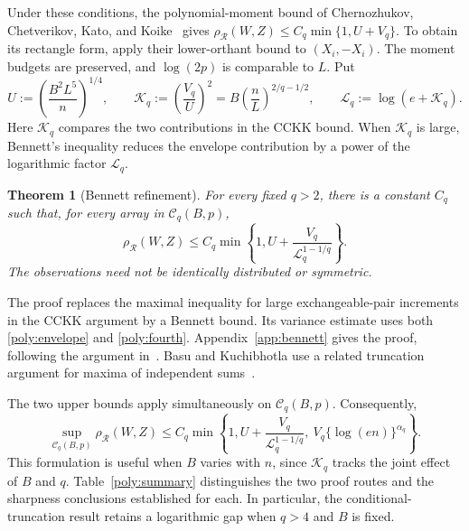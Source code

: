 \documentclass[11pt,letterpaper]{article}
\newtheorem{theorem}{Theorem}
\theoremstyle{remark}
\newcommand{\rh}{\rho_{\mathcal R}}
\begin{document}
Under these conditions, the polynomial-moment bound of Chernozhukov,
Chetverikov, Kato, and Koike~\cite[Theorem~2.5]{CCKK2022} gives
\(\rh(W,Z)\le C_q\min\{1,U+V_q\}\). To obtain its rectangle form,
apply their lower-orthant bound to \((X_i,-X_i)\). The moment budgets
are preserved, and \(\log(2p)\) is comparable to \(L\). Put
\begin{equation}
 U:=\left(\frac{B^2L^5}{n}\right)^{1/4},\qquad
 \mathcal K_q:=\left(\frac{V_q}{U}\right)^2
     =B\left(\frac nL\right)^{2/q-1/2},\qquad
 \mathcal{L}_q:=\log(e+\mathcal K_q).
 \label{poly:bennett-parameters}
\end{equation}
Here \(\mathcal K_q\) compares the two contributions in the CCKK bound.
When \(\mathcal K_q\) is large, Bennett's inequality reduces the envelope
contribution by a power of the logarithmic factor \(\mathcal{L}_q\).

\begin{theorem}[Bennett refinement]\label{poly:bennett}
For every fixed \(q>2\), there is a constant \(C_q\) such that, for
every array in \(\mathcal C_q(B,p)\),
\begin{equation}
 \rh(W,Z)\le C_q\min\left\{1,
 U+\frac{V_q}{\mathcal{L}_q^{1-1/q}}\right\}.
 \label{poly:bennett-bound}
\end{equation}
The observations need not be identically distributed or symmetric.
\end{theorem}

The proof replaces the maximal inequality for large exchangeable-pair
increments in the CCKK argument by a Bennett bound. Its variance estimate
uses both \eqref{poly:envelope} and \eqref{poly:fourth}.
Appendix~\ref{app:bennett} gives the proof, following the argument
in~\cite{BennettNote}. Basu and Kuchibhotla use a related truncation
argument for maxima of independent sums~\cite[Proposition~4.2]{BK2025}.

The two upper bounds apply simultaneously on \(\mathcal C_q(B,p)\).
Consequently,
\begin{equation}
 \sup_{\mathcal C_q(B,p)}\rh(W,Z)
 \le C_q\min\left\{1,
 U+\frac{V_q}{\mathcal{L}_q^{1-1/q}},\ V_q\{\log(en)\}^{\alpha_q}\right\}.
 \label{poly:combined}
\end{equation}
This formulation is useful when \(B\) varies with \(n\), since \(\mathcal K_q\) tracks the joint
effect of \(B\) and \(q\).
Table~\ref{poly:summary} distinguishes the two proof routes and the
sharpness conclusions established for each. In particular, the
conditional-truncation result retains a logarithmic gap when \(q>4\)
and \(B\) is fixed.
\end{document}
